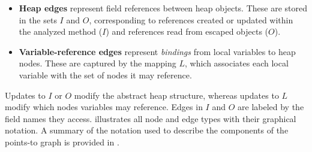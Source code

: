\documentclass{article}
\begin{document}
\begin{itemize}
    \item \textbf{Heap edges} represent field references between heap objects. These are stored in the sets $I$ and $O$, corresponding to references created or updated within the analyzed method ($I$) and references read from escaped objects ($O$).

    \item \textbf{Variable-reference edges} represent \emph{bindings} from local variables to heap nodes. These are captured by the mapping $L$, which associates each local variable with the set of nodes it may reference.
\end{itemize}

\noindent Updates to $I$ or $O$ modify the abstract heap structure, whereas updates to $L$ modify which nodes variables may reference. Edges in $I$ and $O$ are labeled by the field names they access.  illustrates all node and edge types with their graphical notation. A summary of the notation used to describe the components of the points-to graph is provided in .
\end{document}
